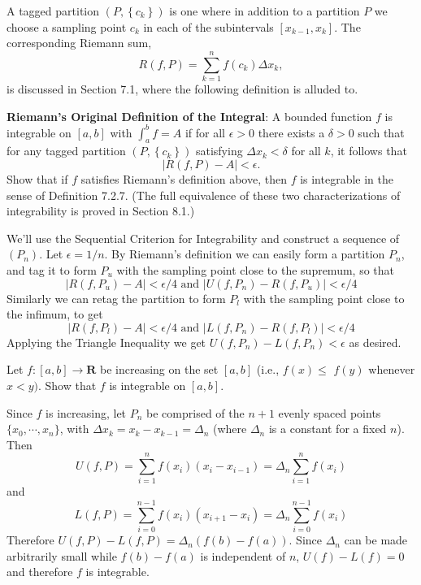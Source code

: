 \begin{exercise}
A tagged partition $\left(P,\left\{c_{k}\right\}\right)$ is one where in addition to a partition $P$ we choose a sampling point $c_{k}$ in each of the subintervals $\left[x_{k-1}, x_{k}\right]$. The corresponding Riemann sum,
$$
R(f, P)=\sum_{k=1}^{n} f\left(c_{k}\right) \Delta x_{k},
$$
is discussed in Section 7.1, where the following definition is alluded to.

{\bf Riemann's Original Definition of the Integral}: A bounded function $f$ is integrable on $[a, b]$ with $\int_{a}^{b} f=A$ if for all $\epsilon>0$ there exists a $\delta>0$ such that for any tagged partition $\left(P,\left\{c_{k}\right\}\right)$ satisfying $\Delta x_{k}<\delta$ for all $k$, it follows that
$$
|R(f, P)-A|<\epsilon .
$$
Show that if $f$ satisfies Riemann's definition above, then $f$ is integrable in the sense of Definition 7.2.7. (The full equivalence of these two characterizations of integrability is proved in Section 8.1.)
\end{exercise}
\begin{solution}
We'll use the Sequential Criterion for Integrability and construct a sequence of \((P_n)\). Let \(\epsilon = 1/n\). By Riemann's definition we can easily form a partition \(P_n\), and tag it to form \(P_u\) with the sampling point close to the supremum, so that
\[|R(f,P_u) - A| < \epsilon/4 \text{ and } |U(f,P_n) - R(f,P_u)| < \epsilon/4\]
 Similarly we can retag the partition to form \(P_l\) with the sampling point close to the infimum, to get
\[|R(f, P_l) - A| < \epsilon/4\text{ and }|L(f,P_n) - R(f, P_l)|<\epsilon/4\]
Applying the Triangle Inequality we get \(U(f,P_n) - L(f,P_n) < \epsilon\) as desired.
\end{solution}

\begin{exercise}
Let $f:[a, b] \rightarrow \mathbf{R}$ be increasing on the set $[a, b]$ (i.e., $f(x) \leq$ $f(y)$ whenever $x<y)$. Show that $f$ is integrable on $[a, b]$.
\end{exercise}
\begin{solution}
Since \(f\) is increasing, let \(P_n\) be comprised of the \(n+1\) evenly spaced points \(\{x_0, \cdots, x_n\}\), with \(\Delta x_k = x_k - x_{k-1} = \Delta_n\) (where \(\Delta_n\) is a constant for a fixed \(n\)). Then
\[U(f,P) = \sum^n_{i=1} f(x_i) (x_i - x_{i-1}) = \Delta_n \sum^n_{i=1}f(x_i)\]
and
\[L(f,P) = \sum^{n-1}_{i=0} f(x_i) (x_{i+1} - x_i) = \Delta_n \sum^{n-1}_{i=0} f(x_i)\]
Therefore \(U(f,P) - L(f,P) = \Delta_n(f(b) - f(a))\). Since \(\Delta_n\) can be made arbitrarily small while \(f(b) - f(a)\) is independent of \(n\), \(U(f) - L(f) = 0\) and therefore \(f\) is integrable.
\end{solution}
